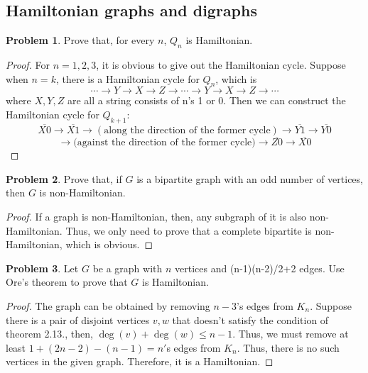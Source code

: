\documentclass[a4paper,11pt]{article}%
\theoremstyle{remark}
\theoremstyle{definition}
\newtheorem{problem}{Problem}[subsection]
\begin{document}
\subsection{Hamiltonian graphs and digraphs}
\begin{problem}
    Prove that, for every $n$, $Q_n$ is Hamiltonian.
    \begin{proof}
        For $n=1,2,3$, it is obvious to give out the Hamiltonian cycle.
        Suppose when $n=k$, there is a Hamiltonian cycle for $Q_n$, which is 
        \[\cdots\rightarrow Y\rightarrow X\rightarrow Z\rightarrow\cdots\rightarrow Y\rightarrow X\rightarrow Z\rightarrow\cdots\]
        where $X,Y,Z$ are all a string consists of n's 1 or 0.
        Then we can construct the Hamiltonian cycle for $Q_{k+1}$:
        \[\overline{X0}\rightarrow\overline{X1}\rightarrow(\text{along the direction of the former cycle})\rightarrow\overline{Y1}\rightarrow\overline{Y0}\]
        \[\rightarrow \text{(against the direction of the former cycle)}\rightarrow\overline{Z0}\rightarrow\overline{X0}\]
    \end{proof}
\end{problem}
\begin{problem}
    Prove that, if $G$ is a bipartite graph with an odd number of vertices, 
    then $G$ is non-Hamiltonian.
    \begin{proof}
   If a graph is non-Hamiltonian, then, any subgraph of it is also non-Hamiltonian.
   Thus, we only need to prove that a complete bipartite is non-Hamiltonian,
   which is obvious. 
    \end{proof}
\end{problem}
\begin{problem}
    Let $G$ be a graph with $n$ vertices and (n-1)(n-2)/2+2 edges.
    Use Ore's theorem to prove that $G$ is Hamiltonian.
    \begin{proof}
        The graph can be obtained by removing $n-3$'s edges from 
        $K_n$. Suppose there is a pair of disjoint vertices $v,w$ that 
        doesn't satisfy the condition of theorem 2.13., then, $\deg(v)+\deg(w)\leq n-1$.
        Thus, we must remove at least $1+(2n-2)-(n-1)=n'$s edges from $K_n$.
        Thus, there is no such vertices in the given graph. Therefore, it is a 
        Hamiltonian. 
    \end{proof}
\end{problem}
\end{document}
